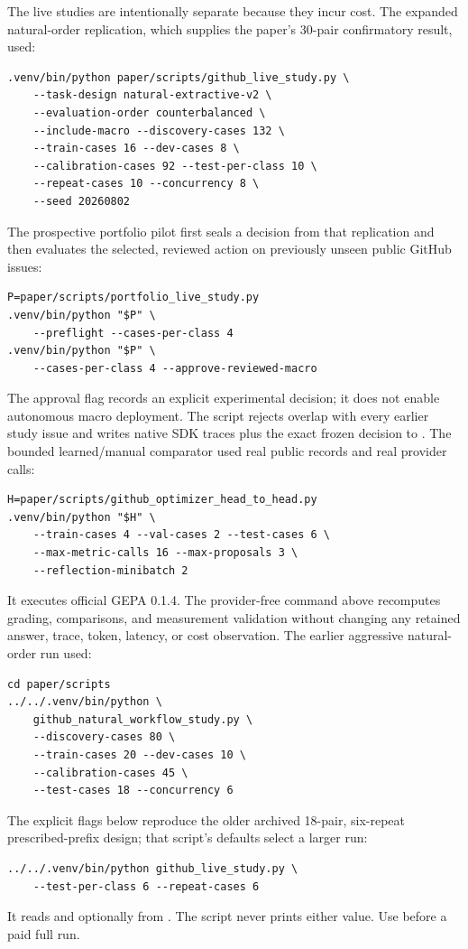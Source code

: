 The live studies are intentionally separate because they incur cost.  The expanded
natural-order replication, which supplies the paper's 30-pair confirmatory result, used:
\begin{verbatim}
.venv/bin/python paper/scripts/github_live_study.py \
    --task-design natural-extractive-v2 \
    --evaluation-order counterbalanced \
    --include-macro --discovery-cases 132 \
    --train-cases 16 --dev-cases 8 \
    --calibration-cases 92 --test-per-class 10 \
    --repeat-cases 10 --concurrency 8 \
    --seed 20260802
\end{verbatim}
The prospective portfolio pilot first seals a decision from that replication and then
evaluates the selected, reviewed action on previously unseen public GitHub issues:
\begin{verbatim}
P=paper/scripts/portfolio_live_study.py
.venv/bin/python "$P" \
    --preflight --cases-per-class 4
.venv/bin/python "$P" \
    --cases-per-class 4 --approve-reviewed-macro
\end{verbatim}
The approval flag records an explicit experimental decision; it does not enable autonomous
macro deployment.  The script rejects overlap with every earlier study issue and writes
native SDK traces plus the exact frozen decision to .
The bounded learned/manual comparator used real public records and real provider calls:
\begin{verbatim}
H=paper/scripts/github_optimizer_head_to_head.py
.venv/bin/python "$H" \
    --train-cases 4 --val-cases 2 --test-cases 6 \
    --max-metric-calls 16 --max-proposals 3 \
    --reflection-minibatch 2
\end{verbatim}
It executes official GEPA 0.1.4.  The provider-free  command
above recomputes grading, comparisons, and measurement validation without changing any
retained answer, trace, token, latency, or cost observation.
The earlier aggressive natural-order run used:
\begin{verbatim}
cd paper/scripts
../../.venv/bin/python \
    github_natural_workflow_study.py \
    --discovery-cases 80 \
    --train-cases 20 --dev-cases 10 \
    --calibration-cases 45 \
    --test-cases 18 --concurrency 6
\end{verbatim}
The explicit flags below reproduce the older archived 18-pair, six-repeat
prescribed-prefix design; that script's defaults select a larger run:
\begin{verbatim}
../../.venv/bin/python github_live_study.py \
    --test-per-class 6 --repeat-cases 6
\end{verbatim}
It reads \code{OPENAI\_API\_KEY} and optionally \code{HF\_TOKEN} from \code{.env}.
The script never prints either value.  Use \code{--smoke} before a paid full run.

